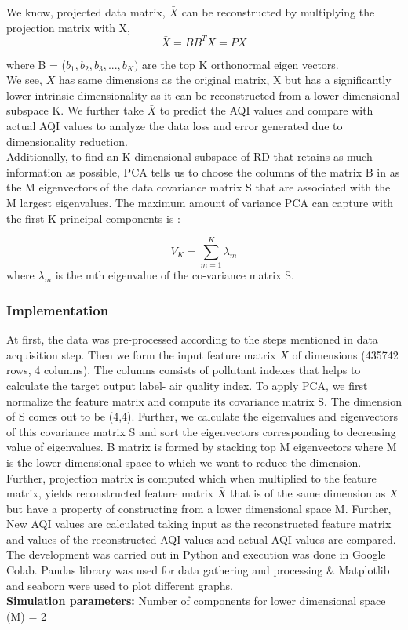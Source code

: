 \documentclass{article}
\begin{document}
 We know, projected data matrix, $\bar{X}$ can be reconstructed by multiplying the projection matrix with X, 
     \begin{equation*}
                \bar{X} = BB^TX = PX
    \end{equation*}

where B = ($b_1, b_2, b_3, ... , b_K)$ are the top K orthonormal eigen vectors. \\ 
We see, $\bar{X}$ has same dimensions as the original matrix, X but has a significantly lower intrinsic dimensionality as it can be reconstructed from a lower dimensional subspace K. We further take $\bar{X}$ to predict the AQI values and compare with actual AQI values to analyze the data loss and error generated due to dimensionality reduction.  \\

Additionally, to find an K-dimensional subspace of RD that retains as much information as possible, PCA tells us to choose the columns of the matrix B in as the M eigenvectors of the data covariance matrix S that are associated with the M largest eigenvalues. The maximum amount of variance PCA can capture with the first K principal components is : 
       
\begin{equation*}
               V_{K} = \sum_{m=1}^{K} \lambda_{m}
\end{equation*}
where $\lambda_{m}$ is the mth eigenvalue of the co-variance matrix S. 
\\ 

\newpage
\subsubsection {\color{brown} \textbf{Implementation}}
At first, the data was pre-processed according to the steps mentioned in data acquisition step. Then we form the input feature matrix $X$ of dimensions (435742 rows, 4 columns). The columns consists of pollutant indexes that helps to calculate the target output label- air quality index. To apply PCA, we first normalize the feature matrix and compute its covariance matrix S. The dimension of S comes out to be (4,4). Further, we calculate the eigenvalues and eigenvectors of this covariance matrix S and sort the eigenvectors corresponding to decreasing value of eigenvalues. B matrix is formed by stacking top M eigenvectors where M is the lower dimensional space to which we want to reduce the dimension. Further, projection matrix is computed which when multiplied to the feature matrix, yields reconstructed feature matrix $\bar{X}$ that is of the same dimension as $X$ but have a property of constructing from a lower dimensional space M. Further, New AQI values are calculated taking input as the reconstructed feature matrix and values of the reconstructed AQI values and actual AQI values are compared. The development was carried out in Python and execution was done in Google Colab. Pandas library was used for data gathering and processing & Matplotlib and seaborn were used to plot different graphs. \\
\textbf{Simulation parameters:} Number of components for lower dimensional space (M) = 2 \\
\end{document}
